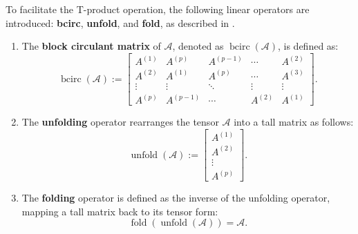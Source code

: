 \documentclass[oupthm]{CUP-JNL-BCM}%
\theoremstyle{oupplain}
\theoremstyle{oupdefinition}
\theoremstyle{oupremark}
\theoremstyle{oupproof}
\numberwithin{equation}{section}
\begin{document}
\noindent To facilitate the T-product operation, the following linear operators are introduced: \textbf{bcirc}, \textbf{unfold}, and \textbf{fold}, as described in \cite{kathrinLund}.  

\begin{enumerate}
    \item The \textbf{block circulant matrix} of \(\mathcal{A}\), denoted as \(\operatorname{bcirc}(\mathcal{A})\), is defined as:  
    \begin{equation}\label{bcircdef}
    \operatorname{bcirc}(\mathcal{A}) := \begin{bmatrix}
    A^{(1)} & A^{(p)} & A^{(p-1)} & \cdots & A^{(2)} \\
    A^{(2)} & A^{(1)} & A^{(p)} & \cdots & A^{(3)} \\
    \vdots & \vdots & \ddots & \vdots & \vdots \\
    A^{(p)} & A^{(p-1)} & \cdots & A^{(2)} & A^{(1)}
    \end{bmatrix}.
    \end{equation}  

    \item The \textbf{unfolding} operator rearranges the tensor \(\mathcal{A}\) into a tall matrix as follows:  
    \[
    \operatorname{unfold}(\mathcal{A}) := \begin{bmatrix}
    A^{(1)} \\
    A^{(2)} \\
    \vdots \\
    A^{(p)}
    \end{bmatrix}.
    \]

    \item The \textbf{folding} operator is defined as the inverse of the unfolding operator, mapping a tall matrix back to its tensor form:  
    \[
    \operatorname{fold}(\operatorname{unfold}(\mathcal{A})) = \mathcal{A}.
    \]  
\end{enumerate}
\end{document}
